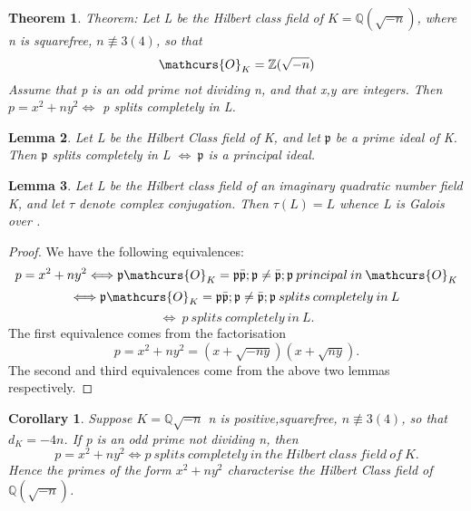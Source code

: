 \documentclass[preprint,12pt,leqno]{elsarticle}
\newtheorem{theorem}{Theorem}
\newtheorem{lemma}[theorem]{Lemma}
\newtheorem{corollary}{Corollary}[theorem]
\begin{document}
\begin{theorem}
Theorem: Let L be the Hilbert class field of $K=\mathbb{Q}(\sqrt{-n})$, where n is squarefree, $n\not\equiv 3(4)$, so that
\begin{equation}
    \mathcurs{O}_K=\mathbb{Z}(\sqrt{-n})
\end{equation}
Assume that p is an odd prime not dividing n, and that x,y are integers. Then 
$p=x^2+ny^2 \Longleftrightarrow$ p splits completely in L.
\end{theorem}
\begin{lemma}
Let L be the Hilbert Class field of K, and let $\mathfrak{p}$ be a prime ideal of K. Then \newline $\mathfrak{p}$ splits completely in L $\Longleftrightarrow\:\mathfrak{p}$ is a principal ideal.
\end{lemma}
\begin{lemma}
Let L be the Hilbert class field of an imaginary quadratic number field K, and let $\tau$ denote complex conjugation. Then $\tau(L)=L$ whence L is Galois over .
\end{lemma}
\begin{proof}
We have the following equivalences:
\begin{equation}
    p=x^2+ny^2\Longleftrightarrow\mathfrak{p}\mathcurs{O}_K=\mathfrak{p}\bar{\mathfrak{p}}; \mathfrak{p}\neq\bar{\mathfrak{p}}; \mathfrak{p}\: principal\:in\: \mathcurs{O}_K
\end{equation}
\begin{equation}
    \Longleftrightarrow\mathfrak{p}\mathcurs{O}_K=\mathfrak{p}\bar{\mathfrak{p}}; \mathfrak{p}\neq\bar{\mathfrak{p}}; \mathfrak{p}\:splits\:completely\:in\:L
\end{equation}
\begin{equation}
    \Longleftrightarrow\:p\:splits\:completely\:in\:L.
\end{equation}
The first equivalence comes from the factorisation 
\begin{equation}
    p=x^2+ny^2=(x+\sqrt{-ny})(x+\sqrt{ny}).
\end{equation}
The second and third equivalences come from the above two lemmas respectively.
\end{proof}
\begin{corollary}
Suppose $K=\mathbb{Q}{\sqrt{-n}}$ n is positive,squarefree, $n\not\equiv 3(4)$, so that $d_K=-4n$. If p is an odd prime not dividing n, then
\begin{equation} p=x^2+ny^2 \Longleftrightarrow p\:splits\:completely\:in\:the\:Hilbert\:class\:field\:of\:K.
\end{equation}
Hence the primes of the form $x^2+ny^2$ characterise the Hilbert Class field of $\mathbb{Q}(\sqrt{-n})$.
\end{corollary}
\end{document}
